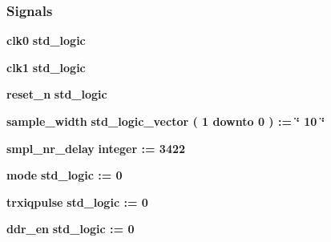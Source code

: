 \subsubsection*{Signals}
 \begin{DoxyCompactItemize}
\item 
{\bf clk0} {\bfseries \textcolor{comment}{std\+\_\+logic}\textcolor{vhdlchar}{ }} 
\item 
{\bf clk1} {\bfseries \textcolor{comment}{std\+\_\+logic}\textcolor{vhdlchar}{ }} 
\item 
{\bf reset\+\_\+n} {\bfseries \textcolor{comment}{std\+\_\+logic}\textcolor{vhdlchar}{ }} 
\item 
{\bf sample\+\_\+width} {\bfseries \textcolor{comment}{std\+\_\+logic\+\_\+vector}\textcolor{vhdlchar}{ }\textcolor{vhdlchar}{(}\textcolor{vhdlchar}{ }\textcolor{vhdlchar}{ } \textcolor{vhdldigit}{1} \textcolor{vhdlchar}{ }\textcolor{keywordflow}{downto}\textcolor{vhdlchar}{ }\textcolor{vhdlchar}{ } \textcolor{vhdldigit}{0} \textcolor{vhdlchar}{ }\textcolor{vhdlchar}{)}\textcolor{vhdlchar}{ }\textcolor{vhdlchar}{ }\textcolor{vhdlchar}{ }\textcolor{vhdlchar}{\+:}\textcolor{vhdlchar}{=}\textcolor{vhdlchar}{ }\textcolor{vhdlchar}{ }\textcolor{vhdlchar}{ }\textcolor{vhdlchar}{ }\textcolor{keyword}{\char`\"{} 10 \char`\"{}}\textcolor{vhdlchar}{ }} 
\item 
{\bf smpl\+\_\+nr\+\_\+delay} {\bfseries \textcolor{comment}{integer}\textcolor{vhdlchar}{ }\textcolor{vhdlchar}{ }\textcolor{vhdlchar}{\+:}\textcolor{vhdlchar}{=}\textcolor{vhdlchar}{ }\textcolor{vhdlchar}{ } \textcolor{vhdldigit}{3422} \textcolor{vhdlchar}{ }} 
\item 
{\bf mode} {\bfseries \textcolor{comment}{std\+\_\+logic}\textcolor{vhdlchar}{ }\textcolor{vhdlchar}{ }\textcolor{vhdlchar}{\+:}\textcolor{vhdlchar}{=}\textcolor{vhdlchar}{ }\textcolor{vhdlchar}{ }\textcolor{vhdlchar}{\textquotesingle{}}\textcolor{vhdlchar}{ } \textcolor{vhdldigit}{0} \textcolor{vhdlchar}{ }\textcolor{vhdlchar}{\textquotesingle{}}\textcolor{vhdlchar}{ }} 
\item 
{\bf trxiqpulse} {\bfseries \textcolor{comment}{std\+\_\+logic}\textcolor{vhdlchar}{ }\textcolor{vhdlchar}{ }\textcolor{vhdlchar}{\+:}\textcolor{vhdlchar}{=}\textcolor{vhdlchar}{ }\textcolor{vhdlchar}{ }\textcolor{vhdlchar}{\textquotesingle{}}\textcolor{vhdlchar}{ } \textcolor{vhdldigit}{0} \textcolor{vhdlchar}{ }\textcolor{vhdlchar}{\textquotesingle{}}\textcolor{vhdlchar}{ }} 
\item 
{\bf ddr\+\_\+en} {\bfseries \textcolor{comment}{std\+\_\+logic}\textcolor{vhdlchar}{ }\textcolor{vhdlchar}{ }\textcolor{vhdlchar}{\+:}\textcolor{vhdlchar}{=}\textcolor{vhdlchar}{ }\textcolor{vhdlchar}{ }\textcolor{vhdlchar}{\textquotesingle{}}\textcolor{vhdlchar}{ } \textcolor{vhdldigit}{0} \textcolor{vhdlchar}{ }\textcolor{vhdlchar}{\textquotesingle{}}\textcolor{vhdlchar}{ }} 

\end{DoxyCompactItemize}
